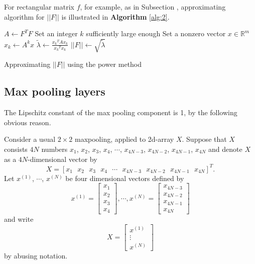 \documentclass[12pt]{report}
\numberwithin{figure}{chapter}
\theoremstyle{plain}
\theoremstyle{definition}
\theoremstyle{corollary}
\theoremstyle{definition}
\theoremstyle{plain}
\theoremstyle{definition}
\theoremstyle{plain}
\begin{document}
For rectangular matrix \(f\), for example, as in Subsection \label{convolutional_layers}, approximating algorithm for \(||F||\) is illustrated in \textbf{Algorithm} \ref{alg:2}.


\begin{algorithm}
\(A\gets F^TF\)\;
Set an integer \(k\) sufficiently large enough\;
Set a nonzero vector \(x\in\mathbb R^m\)\;
\(x_k\gets A^kx\)\;
\(\tilde\lambda\gets\frac{{x_k}^TAx_k}{{x_k}^Tx_k}\)\;
\(||F||\gets\sqrt{\tilde\lambda}\)
\caption{Approximating \(||F||\) using the power method}
\label{alg:2}
\end{algorithm}

\subsection{Max pooling layers}

The Lipschitz constant of the max pooling component is 1, by the following obvious reason.

Consider a usual \(2\times 2\) maxpooling, applied to 2d-array \(X\).
Suppose that \(X\) consists \(4N\) numbers \(x_1\), \(x_2\), \(x_3\), \(x_4\), \(\cdots\), \(x_{4N-3}\), \(x_{4N-2}\), \(x_{4N-1}\), \(x_{4N}\) and denote \(X\) as a \(4N\)-dimensional vector by
\[X=[x_1\:\:\:x_2\:\:\:x_3\:\:\:x_4\:\:\:\cdots\:\:\:x_{4N-3}\:\:\:x_{4N-2}\:\:\:x_{4N-1}\:\:\:x_{4N}]^T.\]
Let \(x^{(1)}\), \(\cdots\), \(x^{(N)}\) be four dimensional vectors defined by
\[x^{(1)}=\begin{bmatrix}x_1\\x_2\\x_3\\x_4\end{bmatrix},\cdots,x^{(N)}=\begin{bmatrix}x_{4N-3}\\x_{4N-2}\\x_{4N-1}\\x_{4N}\end{bmatrix}\]
and write
\[X=\begin{bmatrix}x^{(1)}\\\vdots\\x^{(N)}\end{bmatrix}\]
by abusing notation.
\end{document}
